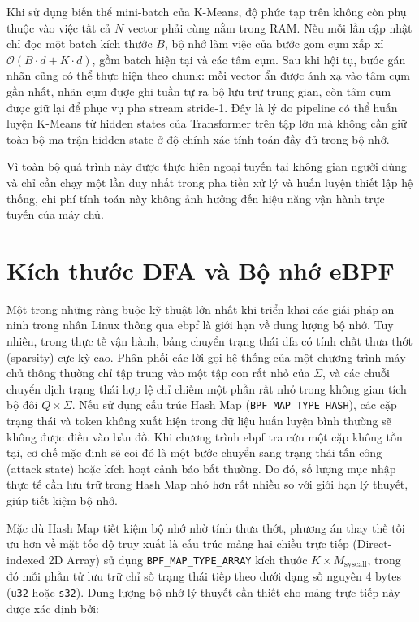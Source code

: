 \documentclass[../main.tex]{subfiles}
\begin{document}
Khi sử dụng biến thể mini-batch của K-Means, độ phức tạp trên không
còn phụ thuộc vào
việc tất cả $N$ vector phải cùng nằm trong RAM. Nếu mỗi lần cập nhật
chỉ đọc một batch
kích thước $B$, bộ nhớ làm việc của bước gom cụm xấp xỉ
$\mathcal{O}(B \cdot d + K \cdot d)$, gồm batch hiện tại và các tâm
cụm. Sau khi hội tụ,
bước gán nhãn cũng có thể thực hiện theo chunk: mỗi vector ẩn được
ánh xạ vào tâm cụm
gần nhất, nhãn cụm được ghi tuần tự ra bộ lưu trữ trung gian, còn tâm
cụm được giữ lại
để phục vụ pha stream stride-1. Đây là lý do pipeline có thể huấn
luyện K-Means từ
hidden states của Transformer trên tập lớn mà không cần giữ toàn bộ
ma trận hidden state
ở độ chính xác tính toán đầy đủ trong bộ nhớ.

Vì toàn bộ quá trình này được thực hiện ngoại tuyến tại không gian
người dùng và chỉ cần chạy một lần duy nhất trong pha tiền xử lý và
huấn luyện thiết lập hệ thống, chi phí tính toán này không ảnh hưởng
đến hiệu năng vận hành trực tuyến của máy chủ.

\section{Kích thước DFA và Bộ nhớ eBPF}
\label{sec:dfa_size_ebpf_memory}

Một trong những ràng buộc kỹ thuật lớn nhất khi triển khai các giải
pháp an ninh trong nhân Linux thông qua \gls{ebpf} là giới hạn về dung
lượng bộ nhớ. Tuy nhiên, trong thực tế vận hành, bảng chuyển trạng
thái \gls{dfa} có tính chất thưa thớt (sparsity) cực kỳ cao. Phân phối các
lời gọi hệ thống của một chương trình máy chủ thông thường chỉ tập
trung vào một tập con rất nhỏ của $\Sigma$, và các chuỗi chuyển dịch
trạng thái hợp lệ chỉ chiếm một phần rất nhỏ trong không gian tích bộ
đôi $Q \times \Sigma$. Nếu sử dụng cấu trúc Hash Map
(\texttt{BPF\_MAP\_TYPE\_HASH}), các cặp trạng thái và token không
xuất hiện trong dữ liệu huấn luyện bình thường sẽ không được điền vào
bản đồ. Khi chương trình \gls{ebpf} tra cứu một cặp không tồn tại, cơ chế
mặc định sẽ coi đó là một bước chuyển sang trạng thái tấn công
(attack state) hoặc kích hoạt cảnh báo bất thường. Do đó, số lượng
mục nhập thực tế cần lưu trữ trong Hash Map nhỏ hơn rất nhiều so với
giới hạn lý thuyết, giúp tiết kiệm bộ nhớ.

Mặc dù Hash Map tiết kiệm bộ nhớ nhờ tính thưa thớt, phương án thay
thế tối ưu hơn về mặt tốc độ truy xuất là cấu trúc mảng hai chiều
trực tiếp (Direct-indexed 2D Array) sử dụng
\texttt{BPF\_MAP\_TYPE\_ARRAY} kích thước $K \times
M_{\text{syscall}}$, trong đó mỗi phần tử lưu trữ chỉ số trạng thái
tiếp theo dưới dạng số nguyên 4 bytes (\texttt{u32} hoặc
\texttt{s32}). Dung lượng bộ nhớ lý thuyết cần thiết cho mảng trực
tiếp này được xác định bởi:
\end{document}
